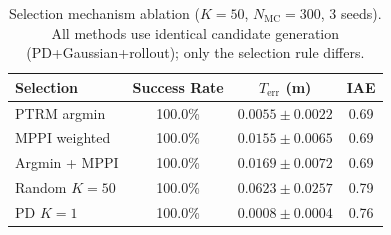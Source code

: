 \begin{table}[t]
\centering
\caption{Selection mechanism ablation ($K\!=\!50$, $N_{\mathrm{MC}}=300$, 3 seeds). All methods use identical candidate generation (PD+Gaussian+rollout); only the selection rule differs.}
\label{tab:selection_ablation}
\begin{tabular}{lccc}
\toprule
Selection & Success Rate & $T_{\mathrm{err}}$ (m) & IAE \\
\midrule
  PTRM argmin & 100.0\% & $0.0055 \pm 0.0022$ & 0.69 \\
  MPPI weighted & 100.0\% & $0.0155 \pm 0.0065$ & 0.69 \\
  Argmin + MPPI & 100.0\% & $0.0169 \pm 0.0072$ & 0.69 \\
  Random $K\!=\!50$ & 100.0\% & $0.0623 \pm 0.0257$ & 0.79 \\
  PD $K\!=\!1$ & 100.0\% & $0.0008 \pm 0.0004$ & 0.76 \\
\bottomrule
\end{tabular}
\end{table}
